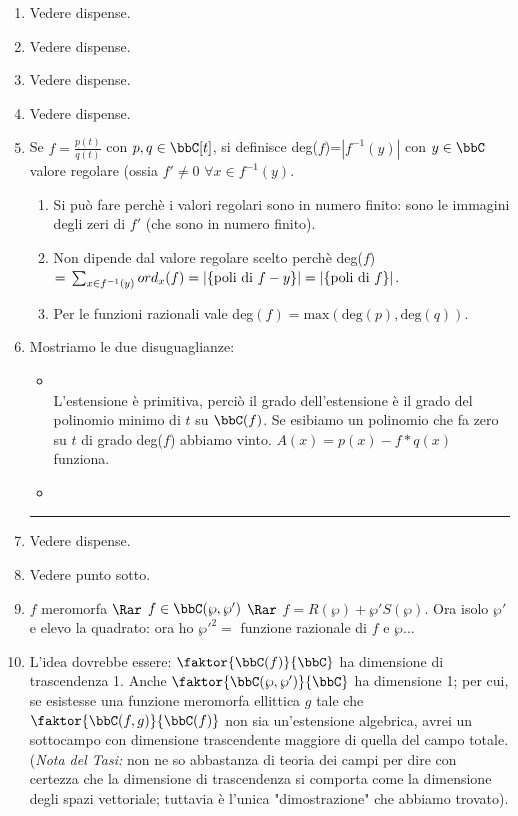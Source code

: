 \begin{enumerate}
\item Vedere dispense.
\item Vedere dispense.
\item Vedere dispense.
\item Vedere dispense.
\item Se $f=\frac{p(t)}{q(t)}$ con $p, q\in \bbC[t]$, si definisce deg($f$)=$|f^{-1}(y)|$ con $y\in \bbC$ valore regolare (ossia $f'\neq 0$ $\forall x\in f^{-1}(y)$.
	\begin{enumerate}[label=(\alph*)]
	\item Si può fare perchè i valori regolari sono in numero finito: sono le immagini degli zeri di $f'$ (che sono in numero finito).
	\item Non dipende dal valore regolare scelto perchè deg($f$)$=\\
		\sum_{x\in f^{-1}(y)}ord_{x}(f)=|\{\mbox{poli di } f-y\}|=|\{\mbox{poli di } f\}|$.
	\item Per le funzioni razionali vale deg$(f)=\mbox{max}(\mbox{deg}(p), \mbox{deg}(q))$.
	\end{enumerate}
\item Mostriamo le due disuguaglianze:
\begin{itemize}
	\item {}\\
		L'estensione è primitiva, perciò il grado dell'estensione è il grado del polinomio minimo di $t$ su $\bbC(f)$. Se esibiamo un polinomio che fa zero su $t$ di grado deg($f$) abbiamo vinto. $A(x)=p(x)-f*q(x)$ funziona.
\bigskip
	\item {}\\
\end{itemize}
\bigskip
\hrule
\bigskip
\item Vedere dispense.
\item Vedere punto sotto. 
\item $f$ meromorfa $\Rar$ $f\in \bbC(\wp, \wp')$ $\Rar$ $f=R(\wp)+\wp'S(\wp)$. Ora isolo $\wp'$ e elevo la quadrato: ora ho $\wp'^{2}=$ funzione razionale di $f$ e $\wp$...
\item L'idea dovrebbe essere: $\faktor{\bbC(f)}{\bbC}$ ha dimensione di trascendenza 1. Anche $\faktor{\bbC(\wp, \wp')}{\bbC}$ ha dimensione 1; per cui, se esistesse una funzione meromorfa ellittica $g$ tale che $\faktor{\bbC(f,g)}{\bbC(f)}$ non sia un'estensione algebrica, avrei un sottocampo con dimensione trascendente maggiore di quella del campo totale. ({\it Nota del Tasi:} non ne so abbastanza di teoria dei campi per dire con certezza che la dimensione di trascendenza si comporta come la dimensione degli spazi vettoriale; tuttavia è l'unica "dimostrazione" che abbiamo trovato).

\end{enumerate}
